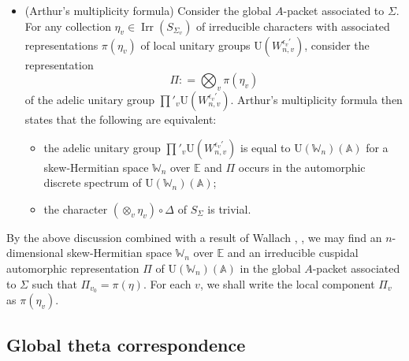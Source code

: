 \documentclass[11pt]{amsart}
\numberwithin{equation}{section}
\theoremstyle{plain}
\theoremstyle{definition}
\theoremstyle{remark}
\def\Irr{\operatorname{Irr}}
\def\U{\mathrm{U}}
\def\AA{\mathbb{A}}
\def\EE{\mathbb{E}}
\def\WW{\mathbb{W}}
\begin{document}
\begin{itemize}
\item (Arthur's multiplicity formula) 
Consider the global $A$-packet associated to $\Sigma$.
For any collection $\eta_v \in \Irr(S_{\Sigma_v})$ of irreducible characters with associated representations $\pi(\eta_v)$ of local unitary groups $\U(W_{n,v}^{\epsilon_v'})$, consider the representation
\[  \Pi : = \bigotimes_v \pi(\eta_v) \]
of the adelic unitary group $\prod'_v \U(W_{n,v}^{\epsilon_v'})$.
Arthur's multiplicity formula \cite[Theorem 1.7.1]{kmsw} then states that the following are equivalent:
\begin{itemize}
\item the adelic unitary group $\prod'_v \U(W_{n,v}^{\epsilon_v'})$ is equal to $\U(\WW_n)(\AA)$ for a skew-Hermitian space $\WW_n$ over $\EE$ and $\Pi$ occurs in the automorphic discrete spectrum of $\U(\WW_n)(\AA)$;
\item the character $(\otimes_v \eta_v) \circ \Delta$ of $S_{\Sigma}$ is trivial.
\end{itemize}
\end{itemize}

By the above discussion combined with a result of Wallach \cite{wallach}, \cite[Proposition 4.10]{clozel}, we may find an $n$-dimensional skew-Hermitian space $\WW_n$ over $\EE$ and an irreducible cuspidal automorphic representation $\Pi$ of $\U(\WW_n)(\AA)$ in the global $A$-packet associated to $\Sigma$ such that $\Pi_{v_0}  = \pi(\eta)$. For each $v$, we shall write the local component $\Pi_v$ as $\pi(\eta_v)$.

\subsection{Global theta correspondence}
\end{document}
